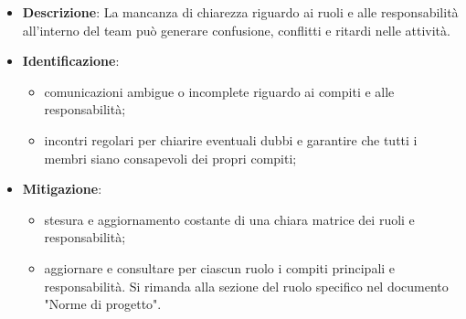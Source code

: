 \label{risk:mancanza di chiarezza nei ruoli e responsabilità}
\begin{itemize}
	\item \textbf{Descrizione}:
			La mancanza di chiarezza riguardo ai ruoli e alle responsabilità 
			all'interno del team può generare confusione, conflitti e ritardi 
			nelle attività.

	\item \textbf{Identificazione}:
	      \begin{itemize}
		      \item comunicazioni ambigue o incomplete riguardo ai compiti e alle responsabilità;

		      \item incontri regolari per chiarire eventuali dubbi e garantire che tutti 
			  		i membri siano consapevoli dei propri compiti;
	      \end{itemize}

	\item \textbf{Mitigazione}:
	      \begin{itemize}
		      \item stesura e aggiornamento costante di una chiara matrice dei ruoli e responsabilità;

		      \item aggiornare e consultare per ciascun ruolo i compiti principali e responsabilità.
			  		Si rimanda alla sezione del ruolo specifico nel documento "Norme di progetto".	
	      \end{itemize}
\end{itemize}
